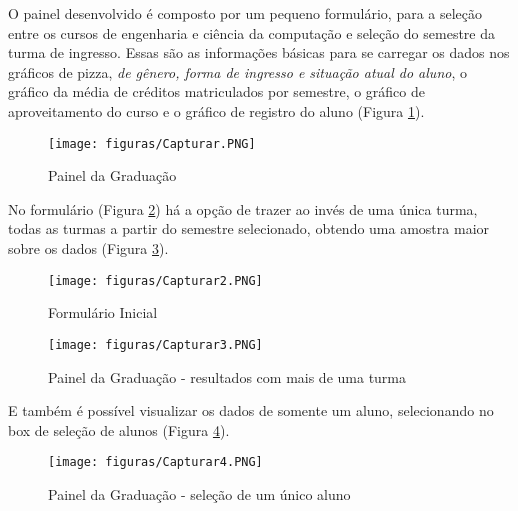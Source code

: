\documentclass[cic,tc]{iiufrgs}
\begin{document}
O painel desenvolvido é composto por um pequeno formulário, para a seleção entre os cursos de engenharia e ciência da computação e seleção do semestre da turma de ingresso. Essas são as informações básicas para se carregar os dados nos gráficos de pizza, \textit{de gênero, forma de ingresso e situação atual do aluno}, o gráfico da média de créditos matriculados por semestre, o gráfico de aproveitamento do curso e o gráfico de registro do aluno (Figura \ref{fig:painelGrad}).


\begin{figure} [!ht]
        \caption{Painel da Graduação}
        \begin{center}
            \texttt{[image: figuras/Capturar.PNG]}
        \end{center}
        
        \label{fig:painelGrad}
    \end{figure}
    

 
No formulário (Figura \ref{fig:formularioInicial}) há a opção de trazer ao invés de uma única turma, todas as turmas a partir do semestre selecionado, obtendo uma amostra maior sobre os dados (Figura \ref{fig:painelGradResultMany}).

\begin{figure} [!ht]
        \caption{Formulário Inicial}
        \begin{center}
            \texttt{[image: figuras/Capturar2.PNG]}
        \end{center}
        
        \label{fig:formularioInicial}
    \end{figure}
 
\begin{figure} [!ht]
        \caption{Painel da Graduação - resultados com mais de uma turma}
        \begin{center}
            \texttt{[image: figuras/Capturar3.PNG]}
        \end{center}
        
        \label{fig:painelGradResultMany}
    \end{figure}
 
 E também é possível visualizar os dados de somente um aluno, selecionando no box de seleção de alunos (Figura \ref{fig:painelGradResultOne}).
 
 \begin{figure} [!ht]
        \caption{Painel da Graduação - seleção de um único aluno}
        \begin{center}
            \texttt{[image: figuras/Capturar4.PNG]}
        \end{center}
        
        \label{fig:painelGradResultOne}
    \end{figure}
\end{document}
